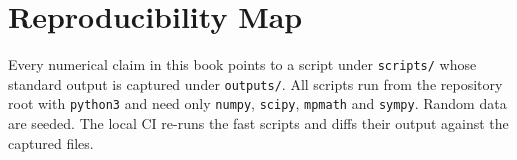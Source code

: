 
\section{Reproducibility Map}
\label{sec:repro}

Every numerical claim in this book points to a script under
\texttt{scripts/} whose standard output is captured under
\texttt{outputs/}. All scripts run from the repository root with
\texttt{python3} and need only \texttt{numpy}, \texttt{scipy},
\texttt{mpmath} and \texttt{sympy}. Random data are seeded. The local CI
re-runs the fast scripts and diffs their output against the captured files.


